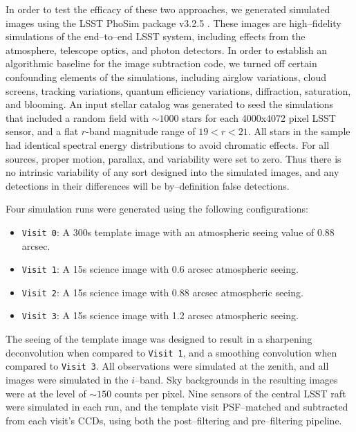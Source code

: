 \documentclass[iop]{emulateapj}
\begin{document}
In order to test the efficacy of these two approaches, we generated simulated images using the LSST PhoSim package v3.2.5 \citep{2010SPIE.7738E..1OC}.
These images are high--fidelity simulations of the end--to--end LSST system, including effects from the atmosphere, telescope optics, and photon detectors.
In order to establish an algorithmic baseline for the image subtraction code, we turned off certain confounding elements of the simulations, including airglow variations, cloud screens, tracking variations, quantum efficiency variations, diffraction, saturation, and blooming.
An input stellar catalog was generated to seed the simulations that included a random field with $\sim 1000$ stars for each 4000x4072 pixel LSST sensor, and a flat $r$-band magnitude range of $19<r<21$.
All stars in the sample had identical spectral energy distributions to avoid chromatic effects.
For all sources, proper motion, parallax, and variability were set to zero.
Thus there is no intrinsic variability of any sort designed into the simulated images, and any detections in their differences will be by--definition false detections.

Four simulation runs were generated using the following configurations:
\begin{itemize}
\item {\tt Visit 0}: A 300s template image with an atmospheric seeing value of 0.88 arcsec.
\item {\tt Visit 1}: A 15s science image with 0.6 arcsec atmospheric seeing.
\item {\tt Visit 2}: A 15s science image with 0.88 arcsec atmospheric seeing.
\item {\tt Visit 3}: A 15s science image with 1.2 arcsec atmospheric seeing.
\end{itemize}
The seeing of the template image was designed to result in a sharpening deconvolution when compared to {\tt Visit 1}, and a smoothing convolution when compared to {\tt Visit 3}.
All observations were simulated at the zenith, and all images were simulated in the $i$--band.
Sky backgrounds in the resulting images were at the level of $\sim 150$ counts per pixel.
Nine sensors of the central LSST raft were simulated in each run, and the template visit PSF--matched and subtracted from each visit's CCDs, using both the post--filtering and pre--filtering pipeline.
\end{document}
